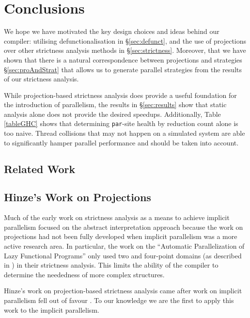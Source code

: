 \section{Conclusions}
\label{sec:conclusion}


We hope we have motivated the key design choices and ideas behind our compiler:
utilising defunctionalisation in \S\ref{sec:defunct}, and the use of
projections over other strictness analysis methods in \S\ref{sec:strictness}.
Moreover, that we have shown that there is a natural correspondence between
projections and strategies \S\ref{sec:proAndStrat} that allows us to generate
parallel strategies from the results of our strictness analysis.

While projection-based strictness analysis does provide a useful foundation for
the introduction of parallelism, the results in \S\ref{sec:results} show that
static analysis alone does not provide the desired speedups. Additionally,
Table \ref{tableGHC} shows that determining \verb-par--site health by reduction
count alone is too naive. Thread collisions that may not happen on a simulated
system are able to significantly hamper parallel performance and should be
taken into account.

\subsection{Related Work}

\subsection*{Hinze's Work on Projections} 

Much of the early work on strictness
analysis as a means to achieve implicit parallelism focused on the abstract
interpretation approach because the work on projections had not been fully
developed when implicit parallelism was a more active research area. In
particular, the work on the ``Automatic Parallelization of Lazy Functional
Programs'' \citep{hogen1992automatic} only used two and four-point domains (as
described in \citep{wadler1987strictness}) in their strictness analysis. This
limits the ability of the compiler to determine the neededness of more complex
structures.

Hinze's work on projection-based strictness analysis came after work on implicit
parallelism fell out of favour \citep{hinze1995projection, hammond2000research}. To
our knowledge we are the first to apply this work to the implicit parallelism.

